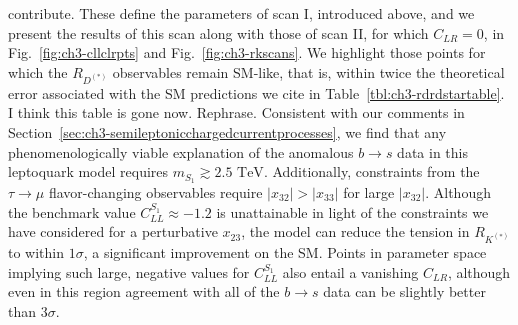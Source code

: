contribute. These define the parameters of scan I, introduced above, and we
present the results of this scan along with those of scan II, for which
$C_{LR} = 0$, in Fig.~\ref{fig:ch3-cllclrpts} and Fig.~\ref{fig:ch3-rkscans}. We
highlight those points for which the $R_{D^{(*)}}$ observables remain SM-like,
that is, within twice the theoretical error associated with the SM predictions
we cite in Table~\ref{tbl:ch3-rdrdstartable}. {\color{red}I think this table is
  gone now. Rephrase.} Consistent with our comments in
Section~\ref{sec:ch3-semileptonicchargedcurrentprocesses}, we find that any
phenomenologically viable explanation of the anomalous $b \to s$ data in this
leptoquark model requires $m_{S_{1}} \gtrsim 2.5 \text{ TeV}$. Additionally,
constraints from the $\tau \to \mu$ flavor-changing observables require
$|x_{32}| > |x_{33}|$ for large $|x_{32}|$. Although the benchmark value
$C_{LL}^{S_{1}} \approx -1.2$ is unattainable in light of the constraints we
have considered for a perturbative $x_{23}$, the model can reduce the tension in
$R_{K^{(*)}}$ to within $1 \sigma$, a significant improvement on the SM. Points
in parameter space implying such large, negative values for $C_{LL}^{S_{1}}$
also entail a vanishing $C_{LR}$, although even in this region agreement with
all of the $b \to s$ data can be slightly better than $3\sigma$.

